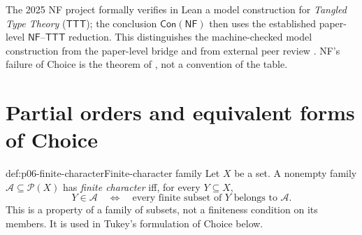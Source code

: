 The 2025 NF project formally verifies in Lean a model construction for
\emph{Tangled Type Theory} (\(\mathsf{TTT}\)); the conclusion
\(\mathsf{Con}(\mathsf{NF})\) then uses the established paper-level
\(\mathsf{NF}\)--\(\mathsf{TTT}\) reduction.  This distinguishes the
machine-checked model construction from the paper-level bridge and from
external peer review
\cite{Wilshaw2025ConNF}.  NF's failure of Choice is the theorem of
\cite{Specker1953}, not a convention of the table.


\section[Partial orders and Choice]{Partial orders and equivalent forms of Choice}


\begin{hbdefinition}{def:p06-finite-character}{Finite-character family}
Let \(X\) be a set.  A nonempty family
\(\mathcal A\subseteq\mathcal P(X)\) has
\emph{finite character} iff, for every \(Y\subseteq X\),
\[
  Y\in\mathcal A
  \quad\Leftrightarrow\quad
  \text{every finite subset of \(Y\) belongs to \(\mathcal A\)}.
\]
This is a property of a family of subsets, not a finiteness condition on its
members.  It is used in Tukey's formulation of Choice below.
\end{hbdefinition}

